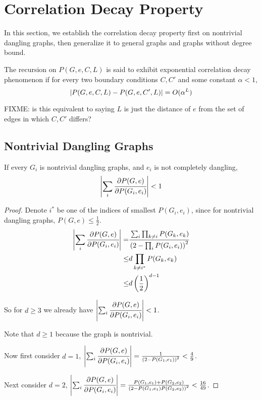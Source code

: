 \section{Correlation Decay Property}
In this section, we establish the correlation decay property first on nontrivial dangling graphs, then generalize it to general graphs and graphs without degree bound.

\begin{Def}
	The recursion on $P(G,e, C, L)$ is said to exhibit exponential correlation decay phenomenon if for every two boundary conditions $C, C'$ and some constant $\alpha <1$,
	\[\left\vert P(G,e,C,L) - P(G,e,C',L)\right\vert = O(\alpha ^L)\]
\end{Def}

FIXME: is this equivalent to saying $L$ is just the distance of $e$ from the set of edges in which $C,C'$ differs?


	\subsection{Nontrivial Dangling Graphs}
	\begin{Prop}
		If every $G_i$ is nontrivial dangling graphs, and $e_i$ is not completely dangling, 
		\begin{align*}
			\left\vert\sum_i \cfrac{\partial P(G,e)}{\partial P(G_i,e_i)}\right\vert < 1 
		\end{align*}
	\end{Prop}

	\begin{proof}
		Denote $i^*$ be one of the indices of smallest $P(G_i, e_i)$, since for nontrivial dangling graphs, $P(G,e) \leq \frac{1}{2}$.
	\begin{align*}
		\left\vert\sum_i \cfrac{\partial P(G,e)}{\partial P(G_i,e_i)}\right\vert  =& \cfrac{\sum_i \prod_{k \neq i} P(G_k, e_k)  }{\left( 2 - \prod_i P(G_i, e_i) \right)^2} \\
		\leq & d \prod_{k \neq i^*} P(G_k, e_k) \\
		\leq & d \left( \frac{1}{2} \right)^{d-1}
	\end{align*}

	So for $d \geq 3$ we already have $\left\vert\sum_i \cfrac{\partial P(G,e)}{\partial P(G_i,e_i)}\right\vert < 1$.

	Note that $d\geq 1$ because the graph is nontrivial.

	Now first consider $d=1$, $\left\vert\sum_i \cfrac{\partial P(G,e)}{\partial P(G_i,e_i)}\right\vert = \frac{1}{\left( 2 - P(G_1,e_1) \right)^2} < \frac{4}{9} $.

	Next consider $d=2$,  $\left\vert\sum_i \cfrac{\partial P(G,e)}{\partial P(G_i,e_i)}\right\vert = \frac{P(G_1,e_1) + P(G_2,e_2)}{\left( 2 - P(G_1,e_1)P(G_2,e_2) \right)^2} < \frac{16}{49} $.
	\end{proof}

